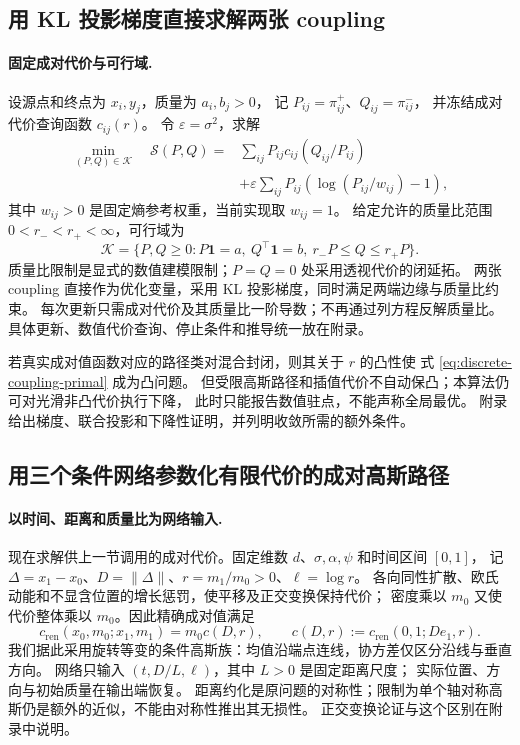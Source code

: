 \documentclass[UTF8,a4paper,11pt,fontset=fandol]{ctexart}
\begin{document}
\clearpage
\subsection*{用 KL 投影梯度直接求解两张 coupling}

\paragraph{固定成对代价与可行域.}
设源点和终点为 $x_i,y_j$，质量为 $a_i,b_j>0$，
记 $P_{ij}=\pi^+_{ij}$、$Q_{ij}=\pi^-_{ij}$，
并冻结成对代价查询函数 $c_{ij}(r)$。
令 $\varepsilon=\sigma^2$，求解
\begin{equation}
\begin{aligned}
\min_{(P,Q)\in\mathcal K}\quad
\mathscr S(P,Q)
={}&\sum_{ij}P_{ij}c_{ij}(Q_{ij}/P_{ij})\\
&+\varepsilon\sum_{ij}P_{ij}\left(\log(P_{ij}/w_{ij})-1\right),
\end{aligned}
\label{eq:discrete-coupling-primal}
\end{equation}
其中 $w_{ij}>0$ 是固定熵参考权重，当前实现取 $w_{ij}=1$。
给定允许的质量比范围 $0<r_-<r_+<\infty$，可行域为
\begin{equation}
\mathcal K=\{P,Q\ge0:P\mathbf1=a,\ Q^\top\mathbf1=b,
\ r_-P\le Q\le r_+P\}.
\label{eq:primal-feasible-set}
\end{equation}
质量比限制是显式的数值建模限制；$P=Q=0$ 处采用透视代价的闭延拓。
两张 coupling 直接作为优化变量，采用 KL 投影梯度，同时满足两端边缘与质量比约束。
每次更新只需成对代价及其质量比一阶导数；不再通过列方程反解质量比。
具体更新、数值代价查询、停止条件和推导统一放在附录。

若真实成对值函数对应的路径类对混合封闭，则其关于 $r$ 的凸性使
式 \eqref{eq:discrete-coupling-primal} 成为凸问题。
但受限高斯路径和插值代价不自动保凸；本算法仍可对光滑非凸代价执行下降，
此时只能报告数值驻点，不能声称全局最优。
附录给出梯度、联合投影和下降性证明，并列明收敛所需的额外条件。

\clearpage
\subsection*{用三个条件网络参数化有限代价的成对高斯路径}

\paragraph{以时间、距离和质量比为网络输入.}
现在求解供上一节调用的成对代价。固定维数 $d$、$\sigma,\alpha,\psi$ 和时间区间 $[0,1]$，
记 $\Delta=x_1-x_0$、$D=\|\Delta\|$、$r=m_1/m_0>0$、$\ell=\log r$。
各向同性扩散、欧氏动能和不显含位置的增长惩罚，使平移及正交变换保持代价；
密度乘以 $m_0$ 又使代价整体乘以 $m_0$。因此精确成对值满足
\begin{equation}
c_{\mathrm{ren}}(x_0,m_0;x_1,m_1)
=m_0c(D,r),\qquad c(D,r):=c_{\mathrm{ren}}(0,1;De_1,r).
\label{eq:translation-mass-reduction}
\end{equation}
我们据此采用旋转等变的条件高斯族：均值沿端点连线，协方差仅区分沿线与垂直方向。
网络只输入 $(t,D/L,\ell)$，其中 $L>0$ 是固定距离尺度；
实际位置、方向与初始质量在输出端恢复。
距离约化是原问题的对称性；限制为单个轴对称高斯仍是额外的近似，不能由对称性推出其无损性。
正交变换论证与这个区别在附录中说明。
\end{document}
